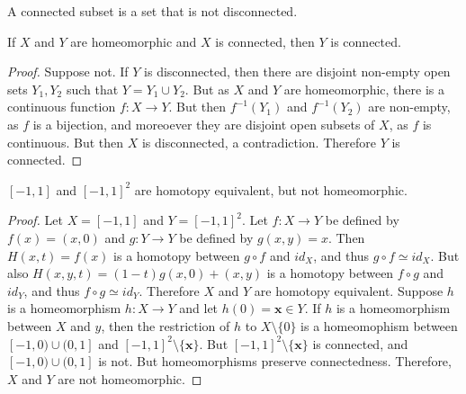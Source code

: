 \documentclass[crop=false,class=book,oneside]{standalone}
\begin{document}
            \begin{definition}
                A connected subset is a set that is not
                disconnected.
            \end{definition}
            \begin{theorem}
                If $X$ and $Y$ are homeomorphic and
                $X$ is connected, then $Y$ is connected.
            \end{theorem}
            \begin{proof}
                Suppose not. If $Y$ is disconnected, then
                there are disjoint non-empty open sets $Y_{1},Y_{2}$
                such that $Y=Y_{1}\cup{Y_{2}}$. But as $X$ and $Y$
                are homeomorphic, there is a continuous function
                $f:X\rightarrow{Y}$. But then
                $f^{-1}(Y_{1})$ and $f^{-1}(Y_{2})$ are
                non-empty, as $f$ is a bijection, and moreoever
                they are disjoint open subsets of $X$, as
                $f$ is continuous. But then $X$ is disconnected,
                a contradiction. Therefore $Y$ is connected.
            \end{proof}
            \begin{theorem}
                $[-1,1]$ and $[-1,1]^{2}$ are homotopy equivalent,
                but not homeomorphic.
            \end{theorem}
            \begin{proof}
                Let $X=[-1,1]$ and $Y=[-1,1]^{2}$.
                Let $f:X\rightarrow{Y}$ be defined by
                $f(x)=(x,0)$ and $g:Y\rightarrow{Y}$ be defined
                by $g(x,y)=x$.
                Then $H(x,t)=f(x)$ is a homotopy between
                $g\circ{f}$ and $id_{X}$, and thus
                $g\circ{f}\simeq{id_{X}}$. But also
                $H(x,y,t)=(1-t)g(x,0)+(x,y)$ is a homotopy
                between $f\circ{g}$ and $id_{Y}$, and thus
                $f\circ{g}\simeq{id_{Y}}$. Therefore $X$ and $Y$
                are homotopy equivalent. Suppose $h$ is a
                homeomorphism $h:X\rightarrow{Y}$ and let
                $h(0)=\mathbf{x}\in{Y}$. If $h$ is a homeomorphism
                between $X$ and $y$, then the restriction of
                $h$ to $X\setminus\{0\}$ is a homeomophism
                between $[-1,0)\cup(0,1]$ and
                $[-1,1]^{2}\setminus\{\mathbf{x}\}$. But
                $[-1,1]^{2}\setminus\{\mathbf{x}\}$ is connected,
                and $[-1,0)\cup(0,1]$ is not. But homeomorphisms
                preserve connectedness. Therefore, $X$ and
                $Y$ are not homeomorphic.
            \end{proof}
\end{document}
